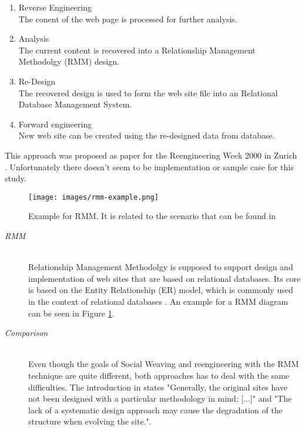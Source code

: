 \begin{enumerate}[A.]
	\begin{enumerate}
		\item Reverse Engineering\\
			The conent of the web page is processed for further analysis.
		\item Analysis\\ 
			The current content is recovered into a Relationship Management Methodolgy (RMM) design.
		\item Re-Design\\
			The recovered design is used to form the web site file into an Relational Database Management System.
		\item Forward engineering\\
			New web site can be created using the re-designed data from database.
	\end{enumerate}
	
	This approach was proposed as paper for the Reengineering Week 2000 in Zurich \cite{antoniol2000web}. Unfortunately there doesn't seem to be implementation or sample case for this study. 

	\begin{figure}\centering
			\texttt{[image: images/rmm-example.png]}
			\caption{Example for RMM. It is related to the scenario that can be found in \cite{antoniol2000web}}
			\label{rmm-example}
	\end{figure} 
	\begin{description}
	
		\item[\emph{RMM}]\mbox{}\\
		Relationship Management Methodolgy is supposed to support design and implementation of web sites that are based on relational databases. Its core is based on the Entity Relationship (ER) model, which is commonly used in the context of relational databases \cite{batini1992conceptual}. An example for a RMM diagram can be seen in Figure \ref{rmm-example}. 
		
		\item[\emph{Comparison}]\mbox{}\\
		Even though the goals of Social Weaving and reengineering with the RMM technique are quite different, both approaches has to deal with the same difficulties. The introduction in \cite{antoniol2000web} states "Generally, the original sites have not been designed with a particular methodology in mind; [...]" and "The lack of a systematic design approach may cause the degradation of the structure when evolving the site.". 
		

\end{description}
\end{enumerate}
